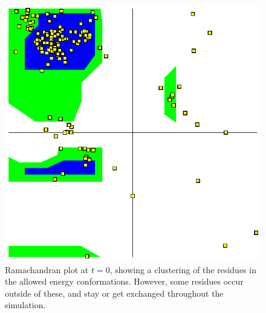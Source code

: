 \documentclass[10pt]{article}\usepackage[]{graphicx}\usepackage[]{color}
\theoremstyle{plain}
\begin{document}
\begin{multicols*}{2}
	\begin{figure}[H]
		\centering
		\includegraphics[width=.3\textwidth]{ramaplot.pdf}
		\caption{Ramachandran plot at $t = 0$, showing a clustering of the residues in the allowed energy conformations. However, some residues occur outside of these, and stay or get exchanged throughout the simulation.}
		\label{fig:rama}
	\end{figure}
	
\end{multicols*}
\end{document}

